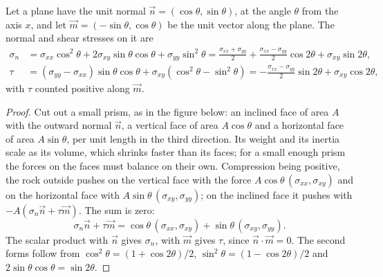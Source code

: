 \begin{proposition}\label{prop:b1:stress-strain-rheology:transformation}
Let a plane have the unit normal $\vec n = (\cos\theta, \sin\theta)$, at the
angle $\theta$ from the axis $x$, and let $\vec m = (-\sin\theta, \cos\theta)$
be the unit vector along the plane. The normal and shear stresses on it are
\begin{align*}
  \sigma_n &= \sigma_{xx}\cos^2\theta + 2\sigma_{xy}\sin\theta\cos\theta + \sigma_{yy}\sin^2\theta
           = \frac{\sigma_{xx}+\sigma_{yy}}{2} + \frac{\sigma_{xx}-\sigma_{yy}}{2}\cos2\theta + \sigma_{xy}\sin2\theta, \\
  \tau     &= (\sigma_{yy}-\sigma_{xx})\sin\theta\cos\theta + \sigma_{xy}(\cos^2\theta - \sin^2\theta)
           = -\frac{\sigma_{xx}-\sigma_{yy}}{2}\sin2\theta + \sigma_{xy}\cos2\theta ,
\end{align*}
with $\tau$ counted positive along $\vec m$.
\end{proposition}

\begin{proof}
Cut out a small prism, as in the figure below: an
inclined face of area $A$ with the outward normal $\vec n$, a vertical face of
area $A\cos\theta$ and a horizontal face of area $A\sin\theta$, per unit
length in the third direction. Its weight and its inertia scale as its volume,
which shrinks faster than its faces; for a small enough prism the forces on
the faces must balance on their own. Compression being positive, the rock
outside pushes on the vertical face with the force
$A\cos\theta\,(\sigma_{xx}, \sigma_{xy})$ and on the horizontal face with
$A\sin\theta\,(\sigma_{xy}, \sigma_{yy})$; on the inclined face it pushes
with $-A(\sigma_n\vec n + \tau\vec m)$. The sum is zero:
\[
  \sigma_n\vec n + \tau\vec m = \cos\theta\,(\sigma_{xx}, \sigma_{xy}) + \sin\theta\,(\sigma_{xy}, \sigma_{yy}) .
\]
The scalar product with $\vec n$ gives $\sigma_n$, with $\vec m$ gives $\tau$,
since $\vec n\cdot\vec m = 0$. The second forms follow from
$\cos^2\theta = (1+\cos2\theta)/2$, $\sin^2\theta = (1-\cos2\theta)/2$ and
$2\sin\theta\cos\theta = \sin2\theta$.
\end{proof}

